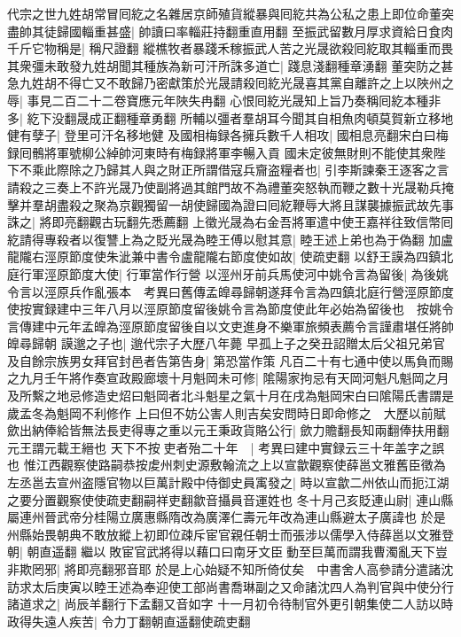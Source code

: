代宗之世九姓胡常冒囘紇之名雜居京師殖貨縱暴與囘紇共為公私之患上即位命董突盡帥其徒歸國輜重甚盛|{
	帥讀曰率輜莊持翻重直用翻}
至振武留數月厚求資給日食肉千斤它物稱是|{
	稱尺證翻}
縱樵牧者暴踐禾稼振武人苦之光晟欲殺囘紇取其輜重而畏其衆彊未敢發九姓胡聞其種族為新可汗所誅多道亡|{
	踐息淺翻種章湧翻}
董突防之甚急九姓胡不得亡又不敢歸乃密獻策於光晟請殺囘紇光晟喜其黨自離許之上以陜州之辱|{
	事見二百二十二卷寶應元年陜失冉翻}
心恨囘紇光晟知上旨乃奏稱囘紇本種非多|{
	紇下没翻晟成正翻種章勇翻}
所輔以彊者羣胡耳今聞其自相魚肉頓莫賀新立移地健有孽子|{
	登里可汗名移地健}
及國相梅録各擁兵數千人相攻|{
	國相息亮翻宋白曰梅録囘鶻將軍號柳公綽帥河東時有梅録將軍李暢入貢}
國未定彼無財則不能使其衆陛下不乘此際除之乃歸其人與之財正所謂借寇兵齎盗糧者也|{
	引李斯諫秦王逐客之言}
請殺之三奏上不許光晟乃使副將過其館門故不為禮董突怒執而鞭之數十光晟勒兵掩擊并羣胡盡殺之聚為京觀獨留一胡使歸國為證曰囘紇鞭辱大將且謀襲據振武故先事誅之|{
	將即亮翻觀古玩翻先悉薦翻}
上徵光晟為右金吾將軍遣中使王嘉祥往致信幣囘紇請得專殺者以復讐上為之貶光晟為睦王傅以慰其意|{
	睦王述上弟也為于偽翻}
加盧龍隴右涇原節度使朱泚兼中書令盧龍隴右節度使如故|{
	使疏吏翻}
以舒王謨為四鎮北庭行軍涇原節度大使|{
	行軍當作行營}
以涇州牙前兵馬使河中姚令言為留後|{
	為後姚令言以涇原兵作亂張本　考異曰舊傳孟皥尋歸朝遂拜令言為四鎮北庭行營涇原節度使按實録建中三年八月以涇原節度留後姚令言為節度使此年必始為留後也　按姚令言傳建中元年孟皥為涇原節度留後自以文吏進身不樂軍旅頻表薦令言謹肅堪任將帥皥尋歸朝}
謨邈之子也|{
	邈代宗子大歷八年薨}
早孤上子之癸丑詔贈太后父祖兄弟官及自餘宗族男女拜官封邑者告第告身|{
	第恐當作策}
凡百二十有七通中使以馬負而賜之九月壬午將作奏宣政殿廊壞十月魁岡未可修|{
	隂陽家拘忌有天岡河魁凡魁岡之月及所繫之地忌修造史炤曰魁岡者北斗魁星之氣十月在戌為魁岡宋白曰隂陽氏書謂是歲孟冬為魁岡不利修作}
上曰但不妨公害人則吉矣安問時日即命修之　大歷以前賦歛出納俸給皆無法長吏得專之重以元王秉政貨賂公行|{
	歛力贍翻長知兩翻俸扶用翻元王謂元載王縉也}
天下不按吏者殆二十年　|{
	考異曰建中實録云三十年盖字之誤也}
惟江西觀察使路嗣恭按䖍州刺史源敷翰流之上以宣歙觀察使薛邕文雅舊臣徵為左丞邕去宣州盗隱官物以巨萬計殿中侍御史員㝢發之|{
	時以宣歙二州依山而扼江湖之要分置觀察使使疏吏翻嗣祥吏翻歙音攝員音運姓也}
冬十月己亥貶連山尉|{
	連山縣屬連州晉武帝分桂陽立廣惠縣隋改為廣澤仁壽元年改為連山縣避太子廣諱也}
於是州縣始畏朝典不敢放縱上初即位疎斥宦官親任朝士而張涉以儒學入侍薛邕以文雅登朝|{
	朝直遥翻}
繼以敗宦官武將得以藉口曰南牙文臣動至巨萬而謂我曹濁亂天下豈非欺罔邪|{
	將即亮翻邪音耶}
於是上心始疑不知所倚仗矣　中書舍人高參請分遣諸沈訪求太后庚寅以睦王述為奉迎使工部尚書喬琳副之又命諸沈四人為判官與中使分行諸道求之|{
	尚辰羊翻行下孟翻又音如字}
十一月初令待制官外更引朝集使二人訪以時政得失遠人疾苦|{
	令力丁翻朝直遥翻使疏吏翻}
